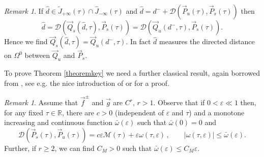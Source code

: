 \documentclass[10pt]{article}
\numberwithin{equation}{section}
\def\dist{{\mathscr{D}}}
\def\ep{\varepsilon}
\def\Om{\Omega}
\def\R{{\mathbb R}}
\def\MM{{\mathcal M}}
\def\DDD{\mathscr{D}}
\def\Q{\vec{Q}}
\def\P{\vec{P}}
\def\f{\vec{f}}
\def\g{\vec{g}}
\theoremstyle{definition}
\theoremstyle{remark}
\newtheorem{remark}[theorem]{Remark}
\begin{document}
 \begin{remark}
       If $ \hat{d}  \in \tilde{J}_{+\infty}(\tau) \cap \hat{J}_{-\infty}(\tau)$ and
       $ \hat{d}= d^- + \DDD(\P_u(\tau), \P_s(\tau))$ then
       $$\hat{d}=\DDD(\Q_s(\hat{d},\tau), \P_s(\tau))=\DDD(\Q_u(d^-,\tau), \P_s(\tau)).$$
       Hence we find $\Q_s(\hat{d},\tau)=\Q_u(d^-,\tau)$. In fact $\hat{d}$ measures the directed distance  on $\Om^0$ between $\Q_u$ and
       $\P_s$.
     \end{remark}
     To prove Theorem \ref{theoremkey} we need a further classical result, again borrowed from \cite{CFPrestate}, see e.g.
     the nice introduction of \cite{JPY} or \cite[\S 4.5]{GH} for a proof.
\begin{remark}\label{rMelni}
	Assume that $\f^{\pm}$ and $\g$ are $C^r$, $r>1$.
Observe that if $0<\ep \ll 1$ then,  for any fixed $\tau \in \R$,
	there are $c>0$ (independent of $\ep$ and $\tau$) and a monotone increasing and continuous function
$\bar{\omega}(\ep)$ such that $\bar{\omega}(0)=0$ and
	$$\dist(\P_s(\tau),\P_u(\tau))= c \ep \MM(\tau)+ \ep  \omega(\tau,\ep) \, , \qquad  |\omega(\tau,\ep)| \le
\bar{\omega}(\ep).$$
Further, if $r \ge 2$, we can find $C_M>0$ such that $\bar{\omega}(\ep) \le C_M \ep$.
\end{remark}
\end{document}
